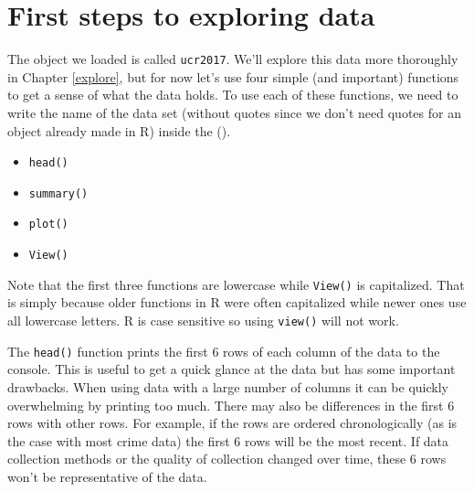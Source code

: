 \documentclass[
  a4paper,
]{krantz}
\providecommand{\tightlist}{%
  \setlength{\itemsep}{0pt}\setlength{\parskip}{0pt}}
\begin{document}
\hypertarget{first-steps-to-exploring-data}{%
\section{First steps to exploring
data}\label{first-steps-to-exploring-data}}

The object we loaded is called \texttt{ucr2017}. We'll
explore this data more thoroughly in Chapter \ref{explore},
but for now let's use four simple (and important) functions
to get a sense of what the data holds. To use each of these
functions, we need to write the name of the data set
(without quotes since we don't need quotes for an object
already made in R) inside the ().

\begin{itemize}
\tightlist
\item
  \texttt{head()}
\item
  \texttt{summary()}
\item
  \texttt{plot()}
\item
  \texttt{View()}
\end{itemize}

Note that the first three functions are lowercase while
\texttt{View()} is capitalized. That is simply because older
functions in R were often capitalized while newer ones use
all lowercase letters. R is case sensitive so using
\texttt{view()} will not work.

The \texttt{head()} function prints the first 6 rows of each
column of the data to the console. This is useful to get a
quick glance at the data but has some important drawbacks.
When using data with a large number of columns it can be
quickly overwhelming by printing too much. There may also be
differences in the first 6 rows with other rows. For
example, if the rows are ordered chronologically (as is the
case with most crime data) the first 6 rows will be the most
recent. If data collection methods or the quality of
collection changed over time, these 6 rows won't be
representative of the data.
\end{document}
